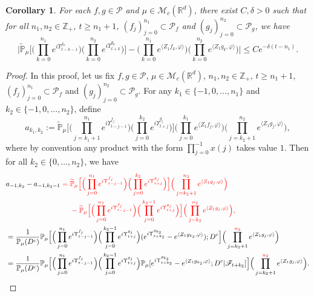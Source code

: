 \documentclass[12pt,a4paper]{amsart}
\theoremstyle{plain}
\newtheorem{cor}[thm]{Corollary}
\theoremstyle{definition}
\numberwithin{equation}{section}
\begin{document}
\begin{cor}
  \label{cor:MI}
For each  $f,g\in \mathcal P$ and $\mu\in \mathcal M_c(\mathbb R^d)$, there exist $C,\delta>0$ such that for
all $n_1,n_2 \in \mathbb Z_+$, {\color{red}$t\geq n_1+1$,} $(f_j)_{j=0}^{n_1}\subset \mathcal P_f$ and $(g_j)_{j=0}^{n_2}\subset \mathcal P_g$, we have 
\begin{equation}
  \label{32corollary}
  \Big|\mathbb{\widetilde{P}}_{\mu}\Big[  \Big(\prod_{k=0}^{n_1}e^{i \Upsilon^{f_k}_{t-k-1}}\Big)  \Big( \prod_{k=0}^{n_2}e^{i \Upsilon^{g_k}_{t+k} } \Big) \Big]  -  \Big(\prod_{k=0}^{n_1} e^{\langle Z_1f_k, \varphi\rangle}\Big) \Big(\prod_{k=0}^{n_2} e^{\langle Z_1g_k, \varphi\rangle}\Big) \Big|\leq C e^{-\delta (t-n_1)}.
\end{equation}
\end{cor}
\begin{proof}
	{\color{red} In this proof, let us fix $f,g\in \mathcal P$, $\mu\in \mathcal M_c(\mathbb R^d)$, $n_1,n_2 \in \mathbb Z_+$, $t\geq n_1 + 1$, $(f_j)_{j=0}^{n_1}\subset \mathcal P_f$ and $(g_j)_{j=0}^{n_2}\subset \mathcal P_g$.}
{\color{red} For any $k_1 \in \{-1,0,\dots,n_1\}$ and $k_2 \in \{-1,0,\dots,n_2\}$},  define
  \[
    a_{k_1,k_2}
    :=  \mathbb{\widetilde{P}}_{\mu}\Big[ \Big(\prod_{j=k_1+1}^{n_1} e^{i\Upsilon_{t-j-1}^{f_j}} \Big)  \Big(\prod_{j=0}^{k_2}e^{i\Upsilon_{t+j}^{g_j}}\Big) \Big] \Big(\prod_{j=0}^{k_1}e^{\langle Z_1 f_j, \varphi\rangle}\Big) \Big(\prod_{j=k_2+1}^{n_2} e^{ \langle Z_1g_j,\varphi \rangle} \Big),
  \]
 where by convention {\color{red} any product with the form $\prod_{j=0}^{-1} x(j)$ takes value $1$.}
  Then for all  $k_2 \in \{0,\dots,n_2\}$, we have
\begin{align}
& \begin{multlined}
	a_{-1,k_2} - a_{-1,k_2-1}
	\color{red} = \mathbb{\widetilde{P}}_{\mu}\Big[ \Big(\prod_{j=0}^{n_1} e^{i\Upsilon_{t-j-1}^{f_j}} \Big)  \Big(\prod_{j=0}^{k_2}e^{i\Upsilon_{t+j}^{g_j}}\Big) \Big] \Big(\prod_{j=k_2+1}^{n_2} e^{ \langle Z_1g_j,\varphi \rangle} \Big) 
	\\ \color{red} - \mathbb{\widetilde{P}}_{\mu}\Big[ \Big(\prod_{j=0}^{n_1} e^{i\Upsilon_{t-j-1}^{f_j}} \Big)  \Big(\prod_{j=0}^{k_2 - 1}e^{i\Upsilon_{t+j}^{g_j}}\Big) \Big] \Big(\prod_{j=k_2}^{n_2} e^{ \langle Z_1g_j,\varphi \rangle} \Big) ,
\end{multlined}
    \\ & =\frac{1}{\mathbb{P}_{\mu}(D^c)} \mathbb{P}_{\mu}\Big[\Big(\prod_{j=0}^{n_1}e^{i\Upsilon_{t-j-1}^{f_j}}\Big) \Big(\prod_{j=0}^{k_2-1} e^{i\Upsilon_{t+j}^{g_j}}\Big) (e^{i\Upsilon^{g_{k_2}}_{t+k_2}}-e^{\langle Z_1g_{k_2}, \varphi\rangle});D^c\Big] \Big(\prod_{j=k_2+1}^{{\color{red} n_2}} e^{\langle Z_1g_j, \varphi\rangle}\Big)\\
    & = \frac{1}{\mathbb{P}_{\mu}(D^c)}  \mathbb{P}_{\mu}\Big[\Big(\prod_{j=0}^{n_1}e^{i\Upsilon_{t-j-1}^{f_j}}\Big)\Big(\prod_{j=0}^{k_2-1} e^{i\Upsilon_{t+j}^{g_j}}\Big) \mathbb P_\mu[e^{i\Upsilon^{g_{k_2}}_{t+k_2}}-e^{\langle Z_1g_{k_2}, \varphi\rangle}; D^c|\mathscr F_{t+k_2}] \Big] \Big(\prod_{j=k_2+1}^{{\color{red} n_2}}e^{\langle Z_1g_j, \varphi\rangle}\Big).
\end{align}


\end{proof}
\end{document}
